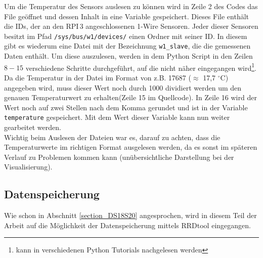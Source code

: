 

Um die Temperatur des Sensors auslesen zu können wird in Zeile 2 des Codes das File geöffnet und dessen Inhalt in eine Variable gespeichert. Dieses File enthält die IDs, der an den \ac{RPI}\,3 angeschlossenen 1-Wire Sensoren. Jeder dieser Sensoren besitzt im Pfad \texttt{/sys/bus/w1/devices/} einen Ordner mit seiner ID. In diesem gibt es wiederum eine Datei mit der Bezeichnung \texttt{w1\_slave}, die die gemessenen Daten enthält. Um diese auszulesen, werden in dem Python Script in den Zeilen $8-15$ verschiedene Schritte durchgeführt, auf die nicht näher eingegangen wird\footnote{kann in verschiedenen Python Tutorials nachgelesen werden}. Da die Temperatur in der Datei im Format von z.B. 17687 ($\approx$ 17,7 $^\circ$C) angegeben wird, muss dieser Wert noch durch 1000 dividiert werden um den genauen Temperaturwert zu erhalten(Zeile 15 im Quellcode). In Zeile 16 wird der Wert noch auf zwei Stellen nach dem Komma gerundet und ist in der Variable \texttt{temperature} gespeichert. Mit dem Wert dieser Variable kann nun weiter gearbeitet werden.\\
Wichtig beim Auslesen der Dateien war es, darauf zu achten, dass die Temperaturwerte im richtigen Format ausgelesen werden, da es sonst im späteren Verlauf zu Problemen kommen kann (unübersichtliche Darstellung bei der Visualisierung).

\subsection{Datenspeicherung}
\label{subsectio_Datenspeicherung_DS18S20}
Wie schon in Abschnitt \ref{section_DS18S20} angesprochen, wird in diesem Teil der Arbeit auf die Möglichkeit der Datenspeicherung mittels RRDtool eingegangen. 

